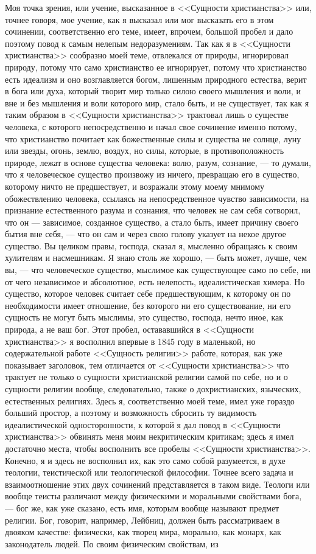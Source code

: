 \documentclass[12pt]{article}
\begin{document}
Моя точка зрения, или учение, высказанное в <<Сущности христианства>>  или, точнее говоря, мое учение, как я высказал или мог высказать его в этом сочинении, соответственно его теме, имеет, впрочем, большой пробел и дало поэтому повод к самым нелепым недоразумениям. Так как я в <<Сущности христианства>>  сообразно моей теме, отвлекался от природы, игнорировал природу, потому что само христианство ее игнорирует, потому что христианство есть идеализм и оно возглавляется богом, лишенным природного естества, верит в бога или духа, который творит мир только силою своего мышления и воли, и вне и без мышления и воли которого мир, стало быть, и не существует, так как я таким образом в <<Сущности христианства>> трактовал лишь о существе человека, с которого непосредственно и начал свое сочинение именно потому, что христианство почитает как божественные силы и существа не солнце, луну или звезды, огонь, землю, воздух, но силы, которые, в противоположность природе, лежат в основе существа человека: волю, разум, сознание, --- то думали, что я человеческое существо произвожу из ничего, превращаю его в существо, которому ничто не предшествует, и возражали этому моему мнимому обожествлению человека, ссылаясь на непосредственное чувство зависимости, на признание естественного разума и сознания, что человек не сам себя сотворил, что он --- зависимое, созданное существо, а стало быть, имеет причину своего бытия вне себя, --- что он сам и через свою голову указует на некое другое существо. Вы целиком правы, господа, сказал я, мысленно обращаясь к своим хулителям и насмешникам. Я знаю столь же хорошо, --- быть может, лучше, чем вы, --- что человеческое существо, мыслимое как существующее само по себе, ни от чего независимое и абсолютное, есть нелепость, идеалистическая химера. Но существо, которое человек считает себе предшествующим, к которому он по необходимости имеет отношение, без которого ни его существование, ни его сущность не могут быть мыслимы, это существо, господа, нечто иное, как природа, а не ваш бог. Этот пробел, остававшийся в <<Сущности христианства>>  я восполнил впервые в 1845 году в маленькой, но содержательной работе <<Сущность религии>>  работе, которая, как уже показывает заголовок, тем отличается от <<Сущности христианства>>  что трактует не только о сущности христианской религии самой по себе, но и о сущности религии вообще, следовательно, также о дохристианских, языческих, естественных религиях. Здесь я, соответственно моей теме, имел уже гораздо больший простор, а поэтому и возможность сбросить ту видимость идеалистической односторонности, к которой я дал повод в <<Сущности христианства>> обвинять меня моим некритическим критикам; здесь я имел достаточно места, чтобы восполнить все пробелы <<Сущности христианства>>. Конечно, я и здесь не восполнил их, как это само собой разумеется, в духе теологии, теистической или теологической философии. Точнее всего задача и взаимоотношение этих двух сочинений представляется в таком виде. Теологи или вообще теисты различают между физическими и моральными свойствами бога, --- бог же, как уже сказано, есть имя, которым вообще называют предмет религии. Бог, говорит, например, Лейбниц, должен быть рассматриваем в двояком качестве: физически, как творец мира, морально, как монарх, как законодатель людей. По своим физическим свойствам, из 
\end{document}
